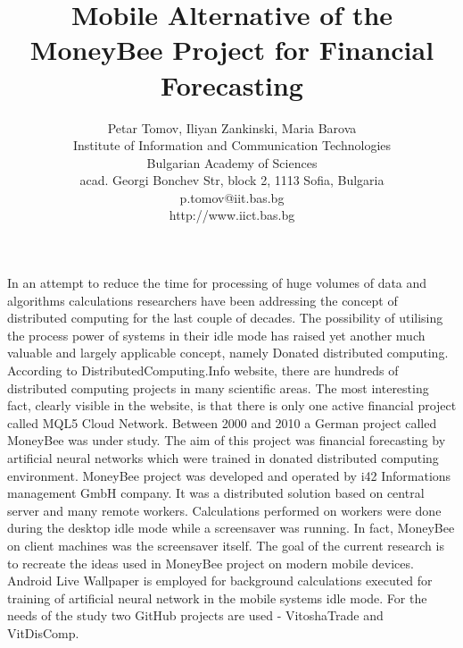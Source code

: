 \documentclass[12pt,a4paper]{article}
\title{\bf Mobile Alternative of the MoneyBee Project for Financial Forecasting}
\author{Petar Tomov, Iliyan Zankinski, Maria Barova \\
Institute of Information and Communication Technologies \\
Bulgarian Academy of Sciences \\
acad. Georgi Bonchev Str, block 2, 1113 Sofia, Bulgaria \\
p.tomov@iit.bas.bg \\
http://www.iict.bas.bg}
\date{}
\begin{document}
\maketitle

In an attempt to reduce the time for processing of huge volumes of data and algorithms calculations researchers have been addressing the concept of distributed computing for the last couple of decades. The possibility of utilising the process power of systems in their idle mode has raised yet another much valuable and largely applicable concept, namely Donated distributed computing. According to DistributedComputing.Info website, there are hundreds of distributed computing projects in many scientific areas. The most interesting fact, clearly visible in the website, is that there is only one active financial project called MQL5 Cloud Network. Between 2000 and 2010 a German project called MoneyBee was under study. The aim of this project was financial forecasting by artificial neural networks which were trained in donated distributed computing environment. MoneyBee project was developed and operated by i42 Informations management GmbH company. It was a distributed solution based on central server and many remote workers. Calculations performed on workers were done during the desktop idle mode while a screensaver was running. In fact, MoneyBee on client machines was the screensaver itself. The goal of the current research is to recreate the ideas used in MoneyBee project on modern mobile devices. Android Live Wallpaper is employed for background calculations executed for training of artificial neural network in the mobile systems idle mode. For the needs of the study two GitHub projects are used - VitoshaTrade and VitDisComp.
\end{document}
